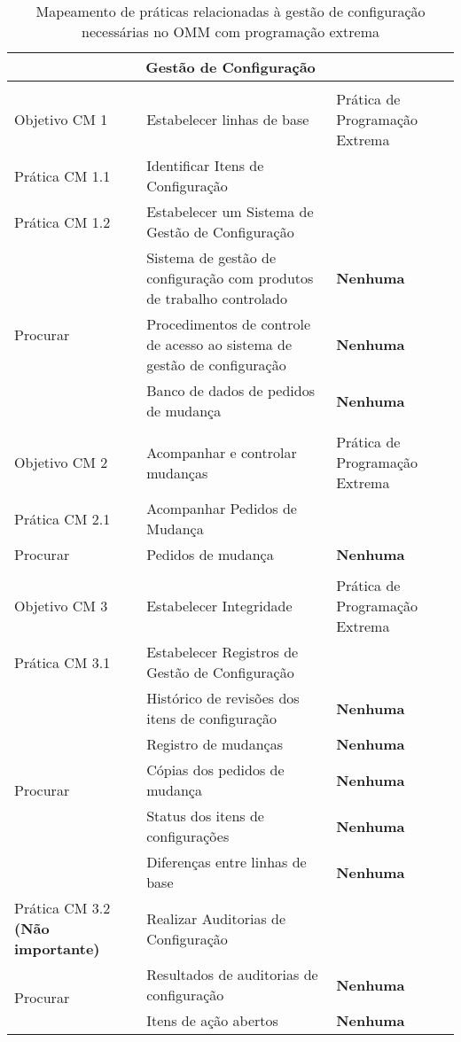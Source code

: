\begin{longtable}{|p{2cm}|p{7cm}|p{7cm}|}
  \caption{Mapeamento de práticas relacionadas à gestão de
    configuração necessárias no OMM com programação extrema} \\
  \multicolumn{3}{|c|}{\cellcolor[gray]{0.6} Gestão de Configuração}\\
  \endhead
  & & \\
  \hline \cellcolor[gray]{0.6} Objetivo CM 1 & \cellcolor[gray]{0.6}
  Estabelecer linhas de base &
  Prática de Programação Extrema \\
  \hline \cellcolor[gray]{0.9} Prática CM 1.1 & \cellcolor[gray]{0.9}
  Identificar Itens de Configuração &
  \\
  \hline \cellcolor[gray]{0.9} Prática CM 1.2 & \cellcolor[gray]{0.9}
  Estabelecer um Sistema de Gestão de Configuração &
  \\
  \hline \multirow{3}{*}{Procurar} & Sistema de gestão de
  configuração com produtos de trabalho controlado  &\textbf{Nenhuma} \\
  \cline{2-3} & Procedimentos de controle de acesso ao sistema de
  gestão de configuração
  &\textbf{Nenhuma} \\
  \cline{2-3} & Banco de dados de pedidos de mudança
  &\textbf{Nenhuma} \\
  \hline
  & & \\
  \hline \cellcolor[gray]{0.6} Objetivo CM 2 & \cellcolor[gray]{0.6}
  Acompanhar e controlar mudanças &
  Prática de Programação Extrema \\
  \hline \cellcolor[gray]{0.9} Prática CM 2.1 &
  \cellcolor[gray]{0.9} Acompanhar Pedidos de Mudança & \\
  \hline \multirow{1}{*}{Procurar} & Pedidos de mudança &
  \textbf{Nenhuma} \\
  \hline
  & & \\
  \hline \cellcolor[gray]{0.6} Objetivo CM 3 &
  \cellcolor[gray]{0.6} Estabelecer Integridade & Prática de Programação Extrema \\
  \hline \cellcolor[gray]{0.9} Prática CM 3.1 &
  \cellcolor[gray]{0.9} Estabelecer Registros de Gestão de Configuração & \\
  \hline \multirow{5}{*}{Procurar} & Histórico de revisões dos itens
  de configuração & \textbf{Nenhuma} \\
  \cline{2-3} & Registro de mudanças & \textbf{Nenhuma} \\
  \cline{2-3} & Cópias dos pedidos de mudança & \textbf{Nenhuma} \\
  \cline{2-3} & Status dos itens de configurações & \textbf{Nenhuma}
  \\
  \cline{2-3} & Diferenças entre linhas de base & \textbf{Nenhuma} \\
  \hline \cellcolor[gray]{0.9} Prática CM 3.2 \textbf{(Não
    importante)} &
  \cellcolor[gray]{0.9} Realizar Auditorias de Configuração & \\
  \hline \multirow{2}{*}{Procurar} & Resultados de auditorias de
  configuração & \textbf{Nenhuma} \\
  \cline{2-3} & Itens de ação abertos  &\textbf{Nenhuma} \\
  \hline
\end{longtable}

